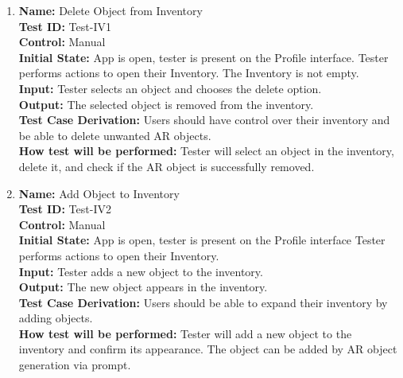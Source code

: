 \documentclass[12pt, titlepage]{article}
\begin{document}
\begin{enumerate}

  \item \textbf{Name:} Delete Object from Inventory \label{itm:Test-IV1} \\
        \textbf{Test ID:} Test-IV1 \\
        \textbf{Control:} Manual \\
        \textbf{Initial State:} App is open, tester is present on the Profile interface. Tester performs actions to open their Inventory. The Inventory is not empty. \\
        \textbf{Input:} Tester selects an object and chooses the delete option. \\
        \textbf{Output:} The selected object is removed from the inventory. \\
        \textbf{Test Case Derivation:} Users should have control over their inventory and be able to delete unwanted AR objects. \\
        \textbf{How test will be performed:} Tester will select an object in the inventory, delete it, and check if the AR object is successfully removed. \\

  \item \textbf{Name:} Add Object to Inventory \label{itm:Test-IV2} \\
        \textbf{Test ID:} Test-IV2 \\
        \textbf{Control:} Manual \\
        \textbf{Initial State:} App is open, tester is present on the Profile interface Tester performs actions to open their Inventory. \\
        \textbf{Input:} Tester adds a new object to the inventory. \\
        \textbf{Output:} The new object appears in the inventory. \\
        \textbf{Test Case Derivation:} Users should be able to expand their inventory by adding objects. \\
        \textbf{How test will be performed:} Tester will add a new object to the inventory and confirm its appearance. The object can be added by AR object generation via prompt. \\


\end{enumerate}
\end{document}
